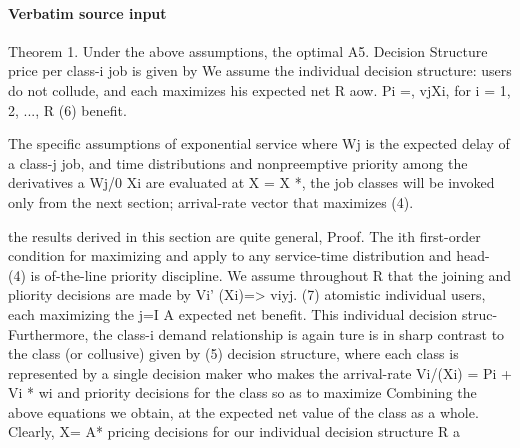 \documentclass[10pt]{article}
\begin{document}
\paragraph{Verbatim source input}
\begin{ReviewVerbatim}
Theorem 1. Under the above assumptions, the optimal
A5. Decision Structure
                                                                      price per class-i job is given by
We assume the individual decision structure: users do
not collude, and each maximizes his expected net
                                                                                 R aow.
                                                                        Pi =, vjXi, for i = 1, 2, ..., R (6)
benefit.

  The specific assumptions of exponential service                      where Wj is the expected delay of a class-j job, and
time distributions and nonpreemptive priority among                    the derivatives a Wj/0 Xi are evaluated at X = X *, the
job classes will be invoked only from the next section;                arrival-rate vector that maximizes (4).

the results derived in this section are quite general,
                                                                       Proof. The ith first-order condition for maximizing
and apply to any service-time distribution and head-
                                                                       (4) is
of-the-line priority discipline. We assume throughout
                                                                                     R
that the joining and pliority decisions are made by
                                                                          Vi'            (Xi)=>           viyj.         (7)
atomistic individual users, each maximizing the                                          j=I A
expected net benefit. This individual decision struc-
                                                                       Furthermore, the class-i demand relationship is again
ture is in sharp contrast to the class (or collusive)
                                                                       given by (5)
decision structure, where each class is represented by
a single decision maker who makes the arrival-rate                      Vi/(Xi) = Pi + Vi * wi
and priority decisions for the class so as to maximize
                                                                       Combining the above equations we obtain, at
the expected net value of the class as a whole. Clearly,
                                                                        X= A*
pricing decisions for our individual decision structure
                                                                                 R a
\end{ReviewVerbatim}
\end{document}
